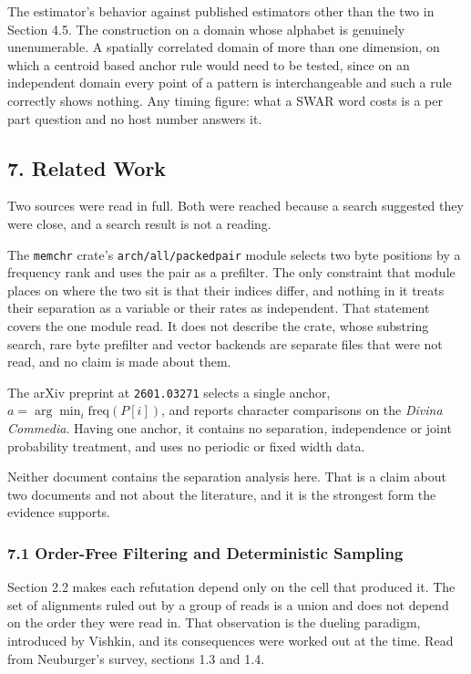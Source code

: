 The estimator's behavior against published estimators other than the two in Section 4.5. The construction on a domain whose alphabet is genuinely unenumerable. A spatially correlated domain of more than one dimension, on which a centroid based anchor rule would need to be tested, since on an independent domain every point of a pattern is interchangeable and such a rule correctly shows nothing. Any timing figure: what a SWAR word costs is a per part question and no host number answers it.

\subsection{7. Related Work}

Two sources were read in full. Both were reached because a search suggested they were close, and a search result is not a reading.

The \texttt{memchr} crate's \texttt{arch/\allowbreak{}all/\allowbreak{}packedpair} module selects two byte positions by a frequency rank and uses the pair as a prefilter. The only constraint that module places on where the two sit is that their indices differ, and nothing in it treats their separation as a variable or their rates as independent. That statement covers the one module read. It does not describe the crate, whose substring search, rare byte prefilter and vector backends are separate files that were not read, and no claim is made about them.

The arXiv preprint at \texttt{2601.\allowbreak{}03271} selects a single anchor, \(a = \arg\min_i \mathrm{freq}(P[i])\), and reports character comparisons on the \emph{Divina Commedia}. Having one anchor, it contains no separation, independence or joint probability treatment, and uses no periodic or fixed width data.

Neither document contains the separation analysis here. That is a claim about two documents and not about the literature, and it is the strongest form the evidence supports.

\subsubsection{7.1 Order-Free Filtering and Deterministic Sampling}

Section 2.2 makes each refutation depend only on the cell that produced it. The set of alignments ruled out by a group of reads is a union and does not depend on the order they were read in. That observation is the dueling paradigm, introduced by Vishkin, and its consequences were worked out at the time. Read from Neuburger's survey, sections 1.3 and 1.4.

